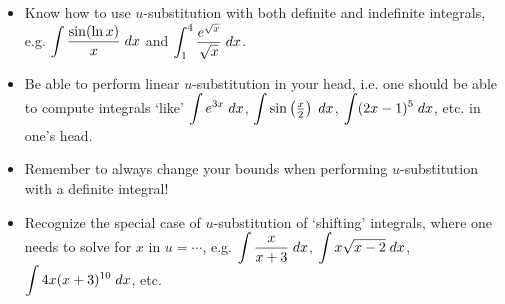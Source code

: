 \documentclass[11pt,letterpaper]{article}
\begin{document}
\begin{itemize}
\item Know how to use $u$-substitution with both definite and indefinite integrals, e.g. $\displaystyle\int \dfrac{\sin(\ln x)}{x} \;dx$ and $\displaystyle\int_1^4 \dfrac{e^{\sqrt{x}}}{\sqrt{x}} \;dx$.

\item Be able to perform linear $u$-substitution in your head, i.e. one should be able to compute integrals `like' $\displaystyle\int e^{3x} \;dx$, $\displaystyle\int \sin\left( \tfrac{x}{2} \right) \;dx$, $\displaystyle\int (2x - 1)^5 \;dx$, etc. in one's head. 

\item Remember to always change your bounds when performing $u$-substitution with a definite integral!

\item Recognize the special case of $u$-substitution of `shifting' integrals, where one needs to solve for $x$ in $u= \cdots$, e.g. $\displaystyle\int \dfrac{x}{x + 3} \;dx$, $\displaystyle\int x \sqrt{x - 2} \;dx$, $\displaystyle\int 4x(x + 3)^{10} \;dx$, etc. 
\end{itemize}
\end{document}
